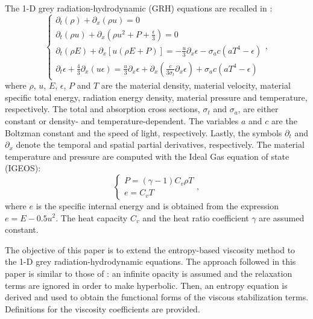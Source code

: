 The 1-D grey radiation-hydrodynamic (GRH) equations are recalled in :
\begin{equation}
\label{eq:equation1}
\left\{
\begin{array}{lll}
\partial_t \left( \rho \right) + \partial_x\left( \rho u \right) = 0 \\
\partial_t \left( \rho u\right) + \partial_x \left(\rho u^2 + P + \frac{\epsilon}{3} \right) = 0 \\
\partial_t \left( \rho E\right) + \partial_x \left[ u \left( \rho E + P \right) \right] = -\frac{u}{3} \partial_x \epsilon - \sigma_a c \left( a T^4 - \epsilon \right) \\
\partial_t \epsilon + \frac{4}{3} \partial_x \left( u \epsilon \right) = \frac{u}{3} \partial_x \epsilon + \partial_x \left( \frac{c}{3 \sigma_t} \partial_x \epsilon \right) + \sigma_a c \left( a T^4 - \epsilon \right)
\end{array}
\right. ,
\end{equation}
where $\rho$, $u$, $E$, $\epsilon$, $P$ and $T$ are the material density, material velocity, material specific total energy, radiation energy density, material pressure and temperature, respectively. The total and absorption cross sections, $\sigma_t$ and $\sigma_a$, are either constant or density- and temperature-dependent. The variables $a$ and $c$ are the Boltzman constant and the speed of light, respectively. Lastly, the symbols $\partial_t$ and $\partial_x$ denote the temporal and spatial partial derivatives, respectively. 
The material temperature and pressure are computed with the Ideal Gas equation of state (IGEOS):
\begin{equation}
\label{eq:equation2}
\left\{
\begin{array}{ll}
P = (\gamma-1) C_v \rho T \\
e = C_v T 
\end{array}
\right. ,
\end{equation}
where $e$ is the specific internal energy and is obtained from the expression $e = E - 0.5 u^2$. The heat capacity $C_v$ and the heat ratio coefficient $\gamma$ are assumed constant. 

The objective of this paper is to extend the entropy-based viscosity method to the 1-D grey radiation-hydrodynamic equations. The approach followed in this paper is similar to those of \cite{Balsara, LowrieMorel}: an infinite opacity is assumed and the relaxation terms are ignored in order to make  hyperbolic. Then, an entropy equation is derived and used to obtain the functional forms of the viscous stabilization terms. Definitions for the viscosity coefficients are provided. 

